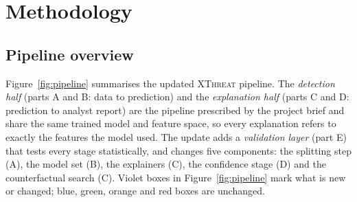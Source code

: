 \documentclass[11pt,a4paper]{article}
\newcommand{\XT}{\textsc{XThreat}}
\begin{document}
\section{Methodology}
\label{sec:method}

\subsection{Pipeline overview}
Figure~\ref{fig:pipeline} summarises the updated \XT{} pipeline. The \emph{detection half} (parts A and B: data to prediction) and the \emph{explanation half} (parts C and D: prediction to analyst report) are the pipeline prescribed by the project brief and share the same trained model and feature space, so every explanation refers to exactly the features the model used. The update adds a \emph{validation layer} (part E) that tests every stage statistically, and changes five components: the splitting step (A), the model set (B), the explainers (C), the confidence stage (D) and the counterfactual search (C). Violet boxes in Figure~\ref{fig:pipeline} mark what is new or changed; blue, green, orange and red boxes are unchanged.
\end{document}

